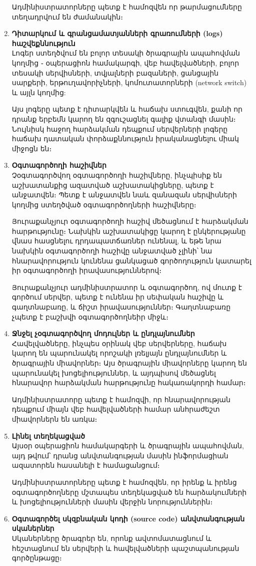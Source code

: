 \documentclass[a4paper,12pt]{article}
\begin{document}
\begin{sloppypar}
\begin{enumerate}
    Ադմինիստրատորները պետք է համոզվեն որ թարմացումները տեղադրվում են
    ժամանակին։
\item \textbf{Դիտարկում և գրանցամատյանների գրառումների (logs) հաշվեքննություն}\\
    Լոգեր ստեղծվում են բոլոր տեսակի ծրագրային ապահովման կողմից ֊
    օպերացիոն համակարգի, վեբ հավելվածների, բոլոր տեսակի սերվիսների,
    տվյալների բազաների, ցանցային սարքերի, երթուղավորիչների, կոմուտատորների (network switch)
	և այլն կողմից:

    Այս լոգերը պետք է դիտարկվեն և հաճախ ստուգվեն, քանի որ դրանք երբեմն
    կարող են զգուշացնել գալիք վտանգի մասին։ Նույնիսկ հաջող հարձակման
    դեպքում սերվերների լոգերը հաճախ դատական փորձաքննություն
    իրականացնելու միակ միջոցն են։
\item \textbf{Օգտագործողի հաշիվներ}\\
    Չօգտագործվող օգտագործողի հաշիվները, ինչպիսիք են աշխատանքից ազատված
    աշխատակիցները, պետք է անջատվեն։ Պետք է անջատվեն նաև զանազան
    սերվիսների կողմից ստեղծված օգտագործողների հաշիվները։

	Յուրաքանչյուր օգտագործողի հաշիվ մեծացնում է հարձակման հարթությունը։
	Նախկին աշխատակիցը կարող է ընկերությանը վնաս հասցնելու դրդապատճառներ
	ունենալ, և եթե նրա նախկին օգտագործողի հաշիվը անջատված չլինի՝
	նա հնարավորություն կունենա ցանկացած գործողություն կատարել
	իր օգտագործողի իրավասություններով։

    Յուրաքանչյուր ադմինիստրատոր և օգտագործող, ով մուտք է գործում
    սերվեր, պետք է ունենա իր սեփական հաշիվը և գաղտնաբառը, և ճիշտ
    իրավասություններ։ Գաղտնաբառը չպետք է բաշխվի օգտագործողնեիր միջև։
\item \textbf{Ջնջել չօգտագործվող մոդուլներ և ընդլայնումներ}\\
    Հավելվածները, ինչպես օրինակ վեբ սերվերները, հաճախ կարող են պարունակել
    որոշակի լռելյայն ընդլայնումներ և ծրագրային միավորներ։
    Այս ծրագրային միավորները կարող են պարունակել խոցելիություններ, և
    այդպիսով մեծացնել հնարավոր հարձակման հարթությունը հակառակորդի համար։

    Ադմինիստրատորը պետք է համոզվի, որ հնարավորության դեպքում միայն
    վեբ հավելվածների համար անհրաժեշտ միավորներն են առկա։
\item \textbf{Լինել տեղեկացված}\\
    Այսօր օպերացիոն համակարգերի և ծրագրային ապահովման,
    այդ թվում՝ դրանց անվտանգության մասին ինֆորմացիան ազատորեն հասանելի է
    համացանցում։

    Ադմինիստրատորները պետք է համոզվեն, որ իրենք և իրենց օգտագործողները
    մշտապես տեղեկացված են հարձակումների և խոցելիությունների մասին
    վերջին նորություններին։
\item \textbf{Օգտագործել սկզբնական կոդի (source code) անվտանգության սկաներներ}\\
    Սկաներները ծրագրեր են, որոնք ավտոմատացնում և հեշտացնում են սերվերի
    և հավելվածների պաշտպանության գործընթացը։


\end{enumerate}
\end{sloppypar}
\end{document}
